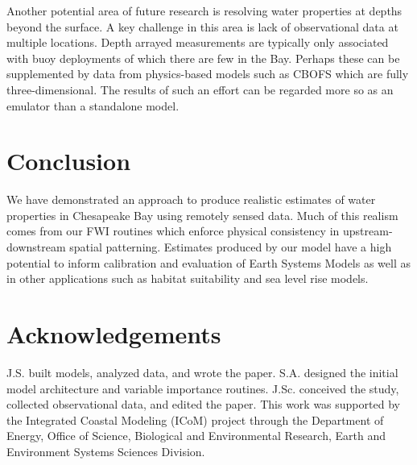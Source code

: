 \documentclass{article}
\begin{document}
Another potential area of future research is resolving water properties at depths beyond the surface. A key challenge in this area is lack of observational data at multiple locations. Depth arrayed measurements are typically only associated with buoy deployments of which there are few in the Bay. Perhaps these can be supplemented by data from physics-based models such as CBOFS which are fully three-dimensional. The results of such an effort can be regarded more so as an emulator than a standalone model.

\section{Conclusion}

We have demonstrated an approach to produce realistic estimates of water properties in Chesapeake Bay using remotely sensed data. Much of this realism comes from our FWI routines which enforce physical consistency in upstream-downstream spatial patterning. Estimates produced by our model have a high potential to inform calibration and evaluation of Earth Systems Models as well as in other applications such as habitat suitability and sea level rise models.

\FloatBarrier

\section{Acknowledgements}

J.S. built models, analyzed data, and wrote the paper. S.A. designed the initial model architecture and variable importance routines. J.Sc. conceived the study, collected observational data, and edited the paper. This work was supported by the Integrated Coastal Modeling (ICoM) project through the Department of Energy, Office of Science,
Biological and Environmental Research, Earth and Environment Systems Sciences Division. 



\end{document}
